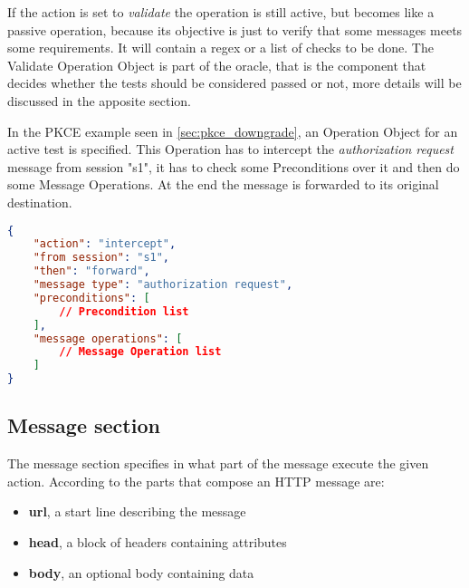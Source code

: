 If the action is set to \textit{validate} the operation is still active, but becomes like a passive operation, because its objective is just to verify that some messages meets some requirements. It will contain a regex or a list of checks to be done. The Validate Operation Object is part of the oracle, that is the component that decides whether the tests should be considered passed or not, more details will be discussed in the apposite section.

In the PKCE example seen in \ref{sec:pkce_downgrade}, an Operation Object for an active test is specified. This Operation has to intercept the \textit{authorization request} message from session "s1", it has to check some Preconditions over it and then do some Message Operations. At the end the message is forwarded to its original destination.

\begin{lstlisting}[language=json, caption=Operation definition]
{
    "action": "intercept",
    "from session": "s1",
    "then": "forward",
    "message type": "authorization request",
    "preconditions": [
        // Precondition list
    ],
    "message operations": [
        // Message Operation list
    ]
}
\end{lstlisting}

\subsection{Message section}
The message section specifies in what part of the message execute the given action.
According to \cite{http} the parts that compose an HTTP message are:
\begin{itemize}
    \item \textbf{url}, a start line describing the message
    \item \textbf{head}, a block of headers containing attributes
    \item \textbf{body}, an optional body containing data
\end{itemize}

